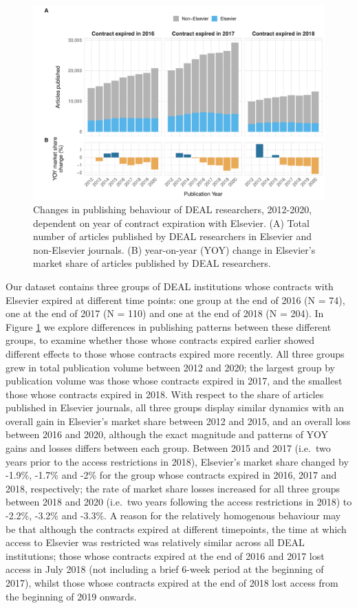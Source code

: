 \documentclass[
]{article}
\begin{document}
\begin{figure}

{\centering \includegraphics[width=0.75\linewidth]{analysis_files/figure-latex/items-publisher-year-cancellation-1} 

}

\caption{Changes in publishing behaviour of DEAL researchers, 2012-2020, dependent on year of contract expiration with Elsevier. (A) Total number of articles published by DEAL researchers in Elsevier and non-Elsevier journals. (B) year-on-year (YOY) change in Elsevier's market share of articles published by DEAL researchers.}\label{fig:items-publisher-year-cancellation}
\end{figure}

Our dataset contains three groups of DEAL institutions whose contracts with Elsevier expired at different time points: one group at the end of 2016 (N = 74), one at the end of 2017 (N = 110) and one at the end of 2018 (N = 204). In Figure \ref{fig:items-publisher-year-cancellation} we explore differences in publishing patterns between these different groups, to examine whether those whose contracts expired earlier showed different effects to those whose contracts expired more recently. All three groups grew in total publication volume between 2012 and 2020; the largest group by publication volume was those whose contracts expired in 2017, and the smallest those whose contracts expired in 2018. With respect to the share of articles published in Elsevier journals, all three groups display similar dynamics with an overall gain in Elsevier's market share between 2012 and 2015, and an overall loss between 2016 and 2020, although the exact magnitude and patterns of YOY gains and losses differs between each group. Between 2015 and 2017 (i.e.~two years prior to the access restrictions in 2018), Elsevier's market share changed by -1.9\%, -1.7\% and -2\% for the group whose contracts expired in 2016, 2017 and 2018, respectively; the rate of market share losses increased for all three groups between 2018 and 2020 (i.e.~two years following the access restrictions in 2018) to -2.2\%, -3.2\% and -3.3\%. A reason for the relatively homogenous behaviour may be that although the contracts expired at different timepoints, the time at which access to Elsevier was restricted was relatively similar across all DEAL institutions; those whose contracts expired at the end of 2016 and 2017 lost access in July 2018 (not including a brief 6-week period at the beginning of 2017), whilst those whose contracts expired at the end of 2018 lost access from the beginning of 2019 onwards.
\end{document}
